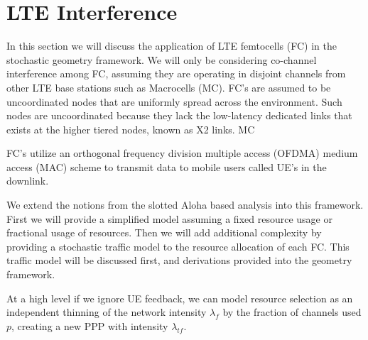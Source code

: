 \section{LTE Interference}
%
In this section we will discuss the application of LTE femtocells (FC) in the stochastic geometry framework.  We will only be considering co-channel interference among FC, assuming they are operating in disjoint channels from other LTE base stations such as Macrocells (MC).  FC's are assumed to be uncoordinated nodes that are uniformly spread across the environment.  Such nodes are uncoordinated because they lack the low-latency dedicated links that exists at the higher tiered nodes, known as X2 links.  MC
%
%
\par
%
FC's utilize an orthogonal frequency division multiple access (OFDMA) medium access (MAC) scheme to transmit data to mobile users called UE's in the downlink.
%
\par
%
We extend the notions from the slotted Aloha based analysis into this framework.  First we will provide a simplified model assuming a fixed resource usage or fractional usage of resources.  Then we will add additional complexity by providing a stochastic traffic model to the resource allocation of each FC.  This traffic model will be discussed first, and derivations provided into the geometry framework.
\par
%
At a high level if we ignore UE feedback, we can model resource selection as an independent thinning of the network intensity $\lambda_{f}$ by the fraction of channels used $p$, creating a new PPP with intensity $\lambda_{tf}$.  
